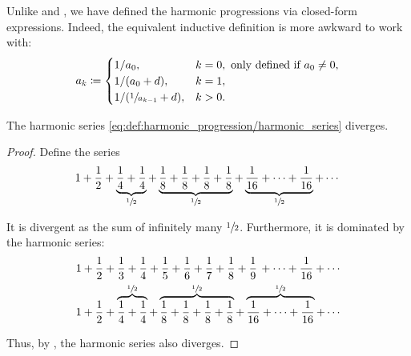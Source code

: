 \begin{remark}\label{rem:harmonic_progression_recursive_form}
  Unlike  and , we have defined the harmonic progressions via closed-form expressions. Indeed, the equivalent inductive definition is more awkward to work with:
  \begin{equation*}
    a_k \coloneqq \begin{cases}
      1 / a_0,                    & k = 0, \text{ only defined if } a_0 \neq 0, \\
      1 / (a_0 + d),                & k = 1,                                      \\
      1 / (\sfrac 1 {a_{k-1}} + d), & k > 0.
    \end{cases}
  \end{equation*}
\end{remark}

\begin{proposition}\label{thm:harmonic_series_diverges}
  The harmonic series \eqref{eq:def:harmonic_progression/harmonic_series} diverges.
\end{proposition}
\begin{proof}
  Define the series
  \begin{equation*}
    1 + \frac 1 2 + \underbrace{\frac 1 4 + \frac 1 4}_{\sfrac 1 2} + \underbrace{\frac 1 8 + \frac 1 8 + \frac 1 8 + \frac 1 8}_{\sfrac 1 2} + \underbrace{\frac 1 {16} + \cdots + \frac 1 {16}}_{\sfrac 1 2} + \cdots
  \end{equation*}

  It is divergent as the sum of infinitely many \( \sfrac 1 2 \). Furthermore, it is dominated by the harmonic series:
  \begin{align*}
    &1 + \frac 1 2 + \frac 1 3 + \frac 1 4 + \frac 1 5 + \frac 1 6 + \frac 1 7 + \frac 1 8 + \frac 1 9 \thinspace + \cdots + \frac 1 {16} + \cdots
    \\
    &1 + \frac 1 2 + \overbrace{ \frac 1 4 + \frac 1 4 }^{\sfrac 1 2} + \overbrace{ \frac 1 8 + \frac 1 8 + \frac 1 8 + \frac 1 8 }^{\sfrac 1 2} + \overbrace{ \frac 1 {16} + \cdots + \frac 1 {16} }^{\sfrac 1 2} + \cdots
  \end{align*}

  Thus, by , the harmonic series also diverges.
\end{proof}


